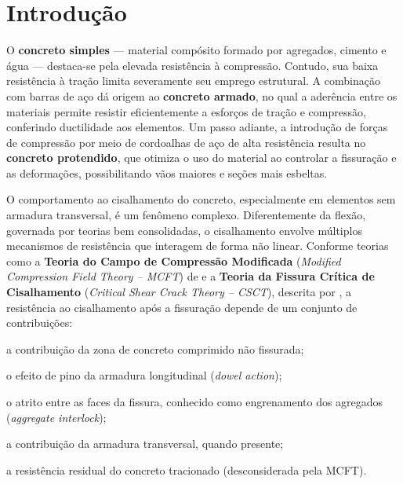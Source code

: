 \documentclass[
	12pt,				%
	openright,			%
	twoside,			%
	a4paper,			%
	chapter=TITLE,		%
	section=TITLE,		%
	subsection=TITLE,	%
	subsubsection=TITLE,%
	partnum=false,
	brazil,			%
]{abntex2}
\begin{document}

\frenchspacing

\imprimircapa
\imprimirfolhaderosto

\tableofcontents*
\cleardoublepage

\textual

\chapter[Introdução]{Introdução}

O \textbf{concreto simples} — material compósito formado por agregados, cimento e água — destaca-se pela elevada resistência à compressão. Contudo, sua baixa resistência à tração limita severamente seu emprego estrutural. A combinação com barras de aço dá origem ao \textbf{concreto armado}, no qual a aderência entre os materiais permite resistir eficientemente a esforços de tração e compressão, conferindo ductilidade aos elementos. Um passo adiante, a introdução de forças de compressão por meio de cordoalhas de aço de alta resistência resulta no \textbf{concreto protendido}, que otimiza o uso do material ao controlar a fissuração e as deformações, possibilitando vãos maiores e seções mais esbeltas.\cite{Araujo2023}

O comportamento ao cisalhamento do concreto, especialmente em elementos sem armadura transversal, é um fenômeno complexo. Diferentemente da flexão, governada por teorias bem consolidadas, o cisalhamento envolve múltiplos mecanismos de resistência que interagem de forma não linear. Conforme teorias como a \textbf{Teoria do Campo de Compressão Modificada} (\textit{Modified Compression Field Theory -- MCFT}) de \textcite{Vecchio1986} e a \textbf{Teoria da Fissura Crítica de Cisalhamento} (\textit{Critical Shear Crack Theory -- CSCT}), descrita por \textcite{Muttoni2023}, a resistência ao cisalhamento após a fissuração depende de um conjunto de contribuições:
\begin{alineas}
    \item a contribuição da zona de concreto comprimido não fissurada;
    \item o efeito de pino da armadura longitudinal (\textit{dowel action});
    \item o atrito entre as faces da fissura, conhecido como engrenamento dos agregados (\textit{aggregate interlock});
    \item a contribuição da armadura transversal, quando presente;
    \item a resistência residual do concreto tracionado (desconsiderada pela MCFT).
\end{alineas}
\end{document}

